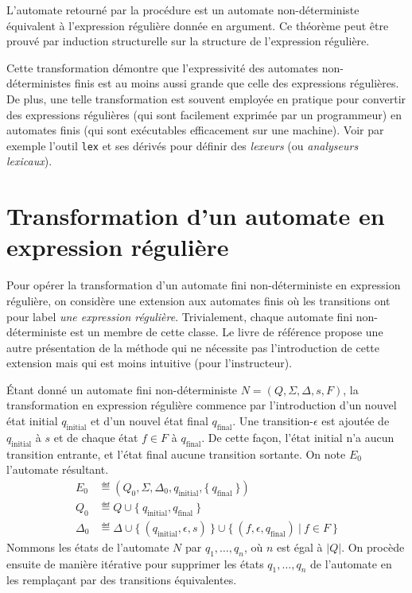 L'automate retourné par la procédure est un automate non-déterministe équivalent à l'expression régulière donnée en argument.
Ce théorème peut être prouvé par induction structurelle sur la structure de l'expression régulière. 

Cette transformation démontre que l'expressivité des automates non-déterministes finis est au moins aussi grande que celle des expressions régulières.
De plus, une telle transformation est souvent employée en pratique pour convertir des expressions régulières (qui sont facilement exprimée par un programmeur) en automates finis (qui sont exécutables efficacement sur une machine).
Voir par exemple l'outil \texttt{lex} et ses dérivés pour définir des \textit{lexeurs} (ou \textit{analyseurs lexicaux}).


\section{Transformation d'un automate en expression régulière}

Pour opérer la transformation d'un automate fini non-déterministe en expression régulière, on considère une extension aux automates finis où les transitions ont pour label \textit{une expression régulière}. Trivialement, chaque automate fini non-déterministe est un membre de cette classe.
Le livre de référence propose une autre présentation de la méthode qui ne nécessite pas l'introduction de cette extension mais qui est moins intuitive (pour l'instructeur).

Étant donné un automate fini non-déterministe $N = (Q, \Sigma, \Delta, s, F)$, la transformation en expression régulière commence par l'introduction d'un nouvel état initial $q_\text{initial}$ et d'un nouvel état final $q_\text{final}$. Une transition-$\epsilon$ est ajoutée de $q_\text{initial}$ à $s$ et de chaque état $f \in F$ à $q_\text{final}$. De cette façon, l'état initial n'a aucun transition entrante, et l'état final aucune transition sortante. On note $E_0$ l'automate résultant.
\begin{align*}
E_0 &\eqdef (Q_0, \Sigma, \Delta_0, q_\text{initial}, \{\ q_\text{final}\ \})\\
Q_0 &\eqdef Q \cup \{\ q_\text{initial}, q_\text{final}\ \}\\
\Delta_0 &\eqdef \Delta \cup \{\ (q_\text{initial}, \epsilon, s)\ \} \cup \{\ (f, \epsilon, q_\text{final})\ |\ f \in F\ \}
\end{align*}
Nommons les états de l'automate $N$ par $q_1, \dots, q_n$, où $n$ est égal à $|Q|$.
On procède ensuite de manière itérative pour supprimer les états $q_1, \dots, q_n$ de l'automate en les remplaçant par des transitions équivalentes.

